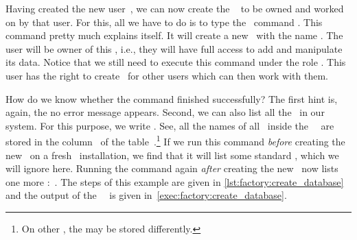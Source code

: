 %
%
\begin{sloppypar}%
Having created the new user~, we can now create the \db\  to be owned and worked on by that user.
For this, all we have to do is to type the \sql\ command .
This command pretty much explains itself.
It will create a new \db\ with the name .
The user  will be owner of this \db, i.e., they will have full access to add and manipulate its data.
Notice that we still need to execute this command under the  role .
This user has the right to create \dbs\ for other users which can then work with them.%
\end{sloppypar}%
%
How do we know whether the command finished successfully?
The first hint is, again, the no error message appears.
Second, we can also list all the \dbs\ in our system.
For this purpose, we write .
See, all the names of all \dbs\ inside the \postgresql\ \dbms\ are stored in the column~ of the table~.\footnote{%
On other , the  may be stored differently.}
If we run this command \emph{before} creating the new \db\ on a fresh \postgresql\ installation, we find that it will list some standard \dbs, which we will ignore here.
Running the command again \emph{after} creating the new \db\ now lists one more \db:~.
The steps of this example are given in \cref{lst:factory:create_database} and the output of the \psql\ \client\ is given in~\cref{exec:factory:create_database}.%
%
\FloatBarrier%
\endhsection%
%
